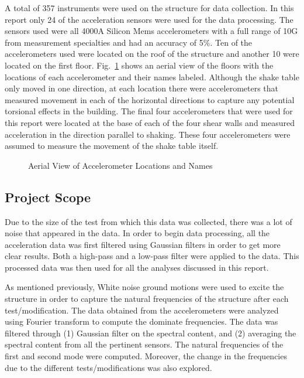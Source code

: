 \documentclass{article}
\begin{document}
A total of 357 instruments were used on the structure for data collection. In this report only 24 of the acceleration sensors were used for the data processing. The sensors used were all 4000A Silicon Mems accelerometers with a full range of 10G from measurement specialties and had an accuracy of 5\%. Ten of the accelerometers used were located on the roof of the structure and another 10 were located on the first floor. Fig.\  \ref{fig:Accels} shows an aerial view of the floors with the locations of each accelerometer and their names labeled. Although the shake table only moved in one direction, at each location there were accelerometers that measured movement in each of the horizontal directions to capture any potential torsional effects in the building. The final four accelerometers that were used for this report were located at the base of each of the four shear walls and measured acceleration in the direction parallel to shaking. These four accelerometers were assumed to measure the movement of the shake table itself. 

\begin{figure}[!htbp]
    \centering
    \qquad
    \caption{Aerial View of Accelerometer Locations and Names}
    \label{fig:Accels}
\end{figure}

\FloatBarrier
\subsection{Project Scope}

Due to the size of the test from which this data was collected, there was a lot of noise that appeared in the data. In order to begin data processing, all the acceleration data was first filtered using Gaussian filters in order to get more clear results. Both a high-pass and a low-pass filter were applied to the data. This processed data was then used for all the analyses discussed in this report. 

\medskip
As mentioned previously, White noise ground motions were used to excite the structure in order to capture the natural frequencies of the structure after each test/modification. The data obtained from the accelerometers were analyzed using Fourier transform to compute the dominate frequencies. The data was filtered through (1) Gaussian filter on the spectral content, and (2) averaging the spectral content from all the pertinent sensors. The natural frequencies of the first and second mode were computed. Moreover, the change in the frequencies due to the different tests/modifications was also explored.
\end{document}
